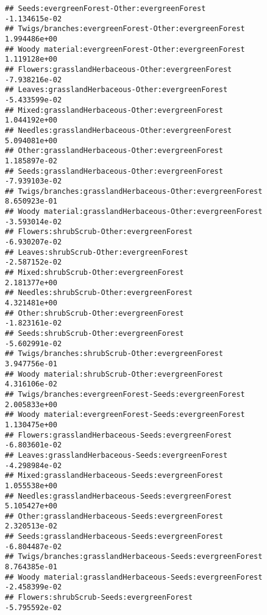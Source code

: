 \documentclass[
]{article}
\begin{document}
\begin{verbatim}
## Seeds:evergreenForest-Other:evergreenForest                           -1.134615e-02
## Twigs/branches:evergreenForest-Other:evergreenForest                   1.994486e+00
## Woody material:evergreenForest-Other:evergreenForest                   1.119128e+00
## Flowers:grasslandHerbaceous-Other:evergreenForest                     -7.938216e-02
## Leaves:grasslandHerbaceous-Other:evergreenForest                      -5.433599e-02
## Mixed:grasslandHerbaceous-Other:evergreenForest                        1.044192e+00
## Needles:grasslandHerbaceous-Other:evergreenForest                      5.094081e+00
## Other:grasslandHerbaceous-Other:evergreenForest                        1.185897e-02
## Seeds:grasslandHerbaceous-Other:evergreenForest                       -7.939103e-02
## Twigs/branches:grasslandHerbaceous-Other:evergreenForest               8.650923e-01
## Woody material:grasslandHerbaceous-Other:evergreenForest              -3.593014e-02
## Flowers:shrubScrub-Other:evergreenForest                              -6.930207e-02
## Leaves:shrubScrub-Other:evergreenForest                               -2.587152e-02
## Mixed:shrubScrub-Other:evergreenForest                                 2.181377e+00
## Needles:shrubScrub-Other:evergreenForest                               4.321481e+00
## Other:shrubScrub-Other:evergreenForest                                -1.823161e-02
## Seeds:shrubScrub-Other:evergreenForest                                -5.602991e-02
## Twigs/branches:shrubScrub-Other:evergreenForest                        3.947756e-01
## Woody material:shrubScrub-Other:evergreenForest                        4.316106e-02
## Twigs/branches:evergreenForest-Seeds:evergreenForest                   2.005833e+00
## Woody material:evergreenForest-Seeds:evergreenForest                   1.130475e+00
## Flowers:grasslandHerbaceous-Seeds:evergreenForest                     -6.803601e-02
## Leaves:grasslandHerbaceous-Seeds:evergreenForest                      -4.298984e-02
## Mixed:grasslandHerbaceous-Seeds:evergreenForest                        1.055538e+00
## Needles:grasslandHerbaceous-Seeds:evergreenForest                      5.105427e+00
## Other:grasslandHerbaceous-Seeds:evergreenForest                        2.320513e-02
## Seeds:grasslandHerbaceous-Seeds:evergreenForest                       -6.804487e-02
## Twigs/branches:grasslandHerbaceous-Seeds:evergreenForest               8.764385e-01
## Woody material:grasslandHerbaceous-Seeds:evergreenForest              -2.458399e-02
## Flowers:shrubScrub-Seeds:evergreenForest                              -5.795592e-02

\end{verbatim}
\end{document}
